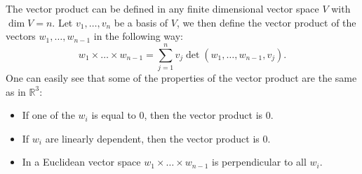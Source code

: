 \documentclass[12pt]{article}
\begin{document}
The vector product can be defined in any finite dimensional vector space $V$ with $\dim V=n$. Let $v_1,\dots,v_n$ be a basis of $V$, we then define the vector product of the vectors $w_1,\dots,w_{n-1}$ in the following way:
$$w_1\times\dots\times w_{n-1}=\sum_{j=1}^nv_j\det(w_1,\dots,w_{n-1},v_j).$$
One can easily see that some of the properties of the vector product are the same as in $\mathbb{R}^3$:
\begin{itemize}
\item If one of the $w_i$ is equal to $0$, then the vector product is $0$.
\item If $w_i$ are linearly dependent, then the vector product is $0$.
\item In a Euclidean vector space $w_1\times\dots\times w_{n-1}$ is perpendicular to all $w_i$.
\end{itemize}
\end{document}
